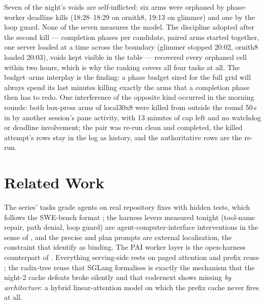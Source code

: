 Seven of the night's voids are self-inflicted: six arms were orphaned by phase-worker deadline kills (18:28--18:29
on ornith8, 19:13 on glimmer) and one by the loop guard. None of the seven measures the model. The discipline
adopted after the second kill --- completion phases per candidate, paired arms started together, one server
loaded at a time across the boundary (glimmer stopped 20:02, ornith8 loaded 20:03), voids kept visible in the
table --- recovered every orphaned cell within two hours, which is why the ranking covers all four tasks at all.
The budget--arms interplay is the finding: a phase budget sized for the full grid will always spend its last
minutes killing exactly the arms that a completion phase then has to redo. One interference of the opposite kind
occurred in the morning rounds: both box-press arms of local30x8 were killed from outside the round 50\,s in by
another session's pane activity, with 13 minutes of cap left and no watchdog or deadline involvement; the pair
was re-run clean and completed, the killed attempt's rows stay in the log as history, and the authoritative rows
are the re-run.

\section{Related Work}\label{sec:related}

The series' tasks grade agents on real repository fixes with hidden tests, which follows the SWE-bench format
\citep{Jimenez-2024aa}; the harness levers measured tonight (tool-name repair, path denial, loop guard) are
agent-computer-interface interventions in the sense of \citet{Yang-2024aa}, and the precise and plan prompts are
external localisation, the constraint that \citet{Xia-2024aa} identify as binding. The PAI worker layer is the
open-harness counterpart of \citet{Wang-2024ab}. Everything serving-side rests on paged attention and prefix
reuse \citep{Kwon-2023aa}; the radix-tree reuse that SGLang formalises \citep{Zheng-2024aa} is exactly the
mechanism that the night-2 cache defeats broke silently and that codernext shows missing \emph{by architecture}:
a hybrid linear-attention model on which the prefix cache never fires at all.

